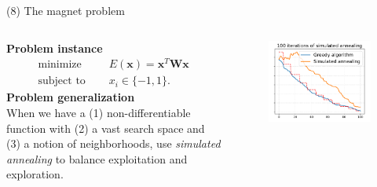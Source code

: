 \documentclass[11pt, aspectratio=149]{beamer}
\theoremstyle{plain}
\begin{document}
\begin{frame}[fragile, t]{(8) The magnet problem}
	\begin{columns}
		\begin{column}{0.55\textwidth}
			\textbf{Problem instance}
			\begin{align*}
			\text{minimize } \quad & E(\mathbf{x}) = \mathbf{x}^T \mathbf{W} \mathbf{x}  \\
			\text{subject to } \quad & x_i \in \{-1, 1\}  .
			\end{align*}
			\textbf{Problem generalization}
			\\
			\vspace*{0.5em} 
			When we have a (1) non-differentiable function with (2) a vast search space and (3) a notion of neighborhoods, use \emph{simulated annealing} to balance exploitation and exploration.
		\end{column}
		\begin{column}{0.45\textwidth}%
	\begin{figure}
		\centering
		\includegraphics[width=1.1\linewidth]{figs/simulated_annealing.pdf} %
	\end{figure}
		\end{column}
	\end{columns}
\end{frame}

\end{document}

